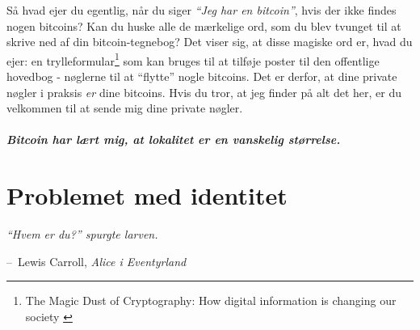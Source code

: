 \documentclass[paper=6in:9in,pagesize=pdftex,headinclude=on,footinclude=on,12pt]{scrbook}
\makeatletter
\newenvironment{chapquote}[2][4em]{\setlength{\@tempdima}{#1}%
   \def\chapquote@author{#2}%
   \parshape 1 \@tempdima \dimexpr\textwidth-2\@tempdima\relax%
   \itshape}{\par\normalfont\hfill--\ \chapquote@author\hspace*{\@tempdima}\par\bigskip}
\makeatother
\begin{document}
Så hvad ejer du egentlig, når du siger \textit{\enquote{Jeg har en bitcoin}}, hvis der ikke findes nogen bitcoins? Kan du huske alle de mærkelige ord, som du blev tvunget til at skrive ned af din bitcoin-tegnebog? Det viser sig, at disse magiske ord er, hvad du ejer: en trylleformular\footnote{The Magic Dust of Cryptography: How digital information is changing our society \cite{gigi:magic-spell}} som kan bruges til at tilføje poster til den offentlige hovedbog - nøglerne til at \enquote{flytte} nogle bitcoins. Det er derfor, at dine private nøgler i praksis \textit{er} dine bitcoins. Hvis du tror, at jeg finder på alt det her, er du velkommen til at sende mig dine private nøgler.\paragraph{Bitcoin har lært mig, at lokalitet er en vanskelig størrelse.}%
%
%
%
%
%
%
%

\chapter{Problemet med identitet}
\label{les:4}

\begin{chapquote}{Lewis Carroll, \textit{Alice i Eventyrland}} \enquote{Hvem er du?} spurgte larven. \end{chapquote}
\end{document}
